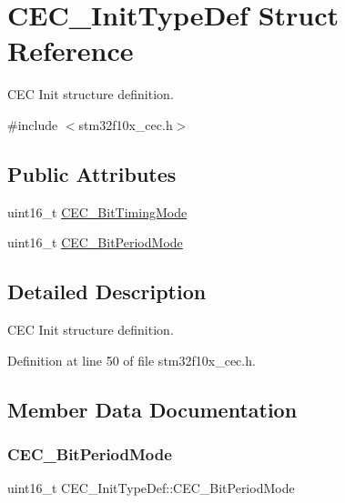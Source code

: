 \hypertarget{struct_c_e_c___init_type_def}{}\section{C\+E\+C\+\_\+\+Init\+Type\+Def Struct Reference}
\label{struct_c_e_c___init_type_def}


C\+EC Init structure definition.  




{\ttfamily \#include $<$stm32f10x\+\_\+cec.\+h$>$}

\subsection*{Public Attributes}
\begin{DoxyCompactItemize}
\item 
uint16\+\_\+t \hyperlink{struct_c_e_c___init_type_def_a197bc5a8957ab0b86d4ecc1347fa9e37}{C\+E\+C\+\_\+\+Bit\+Timing\+Mode}
\item 
uint16\+\_\+t \hyperlink{struct_c_e_c___init_type_def_a3cc27a2030d87a8bea17c6b0750dda2a}{C\+E\+C\+\_\+\+Bit\+Period\+Mode}
\end{DoxyCompactItemize}


\subsection{Detailed Description}
C\+EC Init structure definition. 

Definition at line 50 of file stm32f10x\+\_\+cec.\+h.



\subsection{Member Data Documentation}
\mbox{\label{struct_c_e_c___init_type_def_a3cc27a2030d87a8bea17c6b0750dda2a}} 
\subsubsection{\texorpdfstring{C\+E\+C\+\_\+\+Bit\+Period\+Mode}{CEC\_BitPeriodMode}}
{\footnotesize\ttfamily uint16\+\_\+t C\+E\+C\+\_\+\+Init\+Type\+Def\+::\+C\+E\+C\+\_\+\+Bit\+Period\+Mode}

